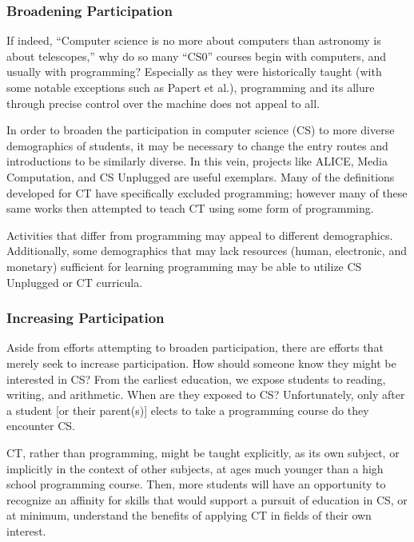 \documentclass{acm_proc_article-sp}
\begin{document}
\subsubsection{Broadening Participation}
\label{sec:broadening_participation}
If indeed, ``Computer science is no more about computers than astronomy is about telescopes,''\cite{cs-astronomy} why do so many ``CS0'' courses begin with computers, and usually with programming? Especially as they were historically taught (with some notable exceptions such as Papert et al.)\cite{logo-readings}, programming and its allure through precise control over the machine does not appeal to all.

In order to broaden the participation in computer science (CS) to more diverse demographics of students, it may be necessary to change the entry routes and introductions to be similarly diverse. 
In this vein, projects like ALICE\cite{pausch1995alice}, Media Computation\cite{guzdial2003media}, and CS Unplugged\cite{csunplugged} are useful exemplars.
Many of the definitions developed for CT have specifically excluded programming; however many of these same works then attempted to teach CT using some form of programming.

Activities that differ from programming may appeal to different demographics.
Additionally, some demographics that may lack resources (human, electronic, and monetary) sufficient for learning programming may be able to utilize CS Unplugged or CT curricula.

\subsubsection{Increasing Participation}
\label{sec:increasing_participation}
Aside from efforts attempting to broaden participation, there are efforts that merely seek to increase participation.
How should someone know they might be interested in CS?
From the earliest education, we expose students to reading, writing, and arithmetic.
When are they exposed to CS?
Unfortunately, only after a student [or their parent(s)] elects to take a programming course do they encounter CS. 

CT, rather than programming, might be taught explicitly, as its own subject, or implicitly in the context of other subjects, at ages much younger than a high school programming course.
Then, more students will have an opportunity to recognize an affinity for skills that would support a pursuit of education in CS, or at minimum, understand the benefits of applying CT in fields of their own interest.
\end{document}
